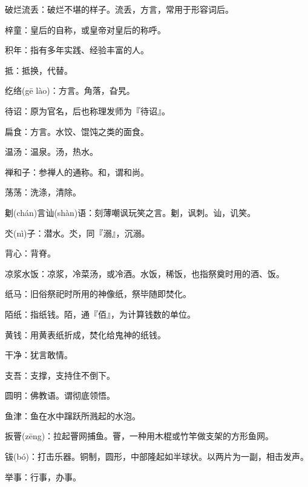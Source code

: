 \startbuffer[1484]
破烂流丢：破烂不堪的样子。流丢，方言，常用于形容词后。
\stopbuffer


\startbuffer[1485]
梓童：皇后的自称，或皇帝对皇后的称呼。
\stopbuffer


\startbuffer[1486]
积年：指有多年实践、经验丰富的人。
\stopbuffer


\startbuffer[1487]
抵：抵换，代替。
\stopbuffer


\startbuffer[1488]
纥络(gē lào)：方言。角落，旮旯。
\stopbuffer


\startbuffer[1489]
待诏：原为官名，后也称理发师为『待诏』。
\stopbuffer


\startbuffer[1490]
扁食：方言。水饺、馄饨之类的面食。
\stopbuffer


\startbuffer[1491]
温汤：温泉。汤，热水。
\stopbuffer


\startbuffer[1492]
禅和子：参禅人的通称。和，谓和尚。
\stopbuffer


\startbuffer[1493]
荡荡：洗涤，清除。
\stopbuffer


\startbuffer[1494]
劖(chán)言讪(shàn)语：刻薄嘲讽玩笑之言。劖，讽刺。讪，讥笑。
\stopbuffer


\startbuffer[1495]
氼(nì)子：潜水。氼，同『溺』，沉溺。
\stopbuffer


\startbuffer[1496]
背心：背脊。
\stopbuffer


\startbuffer[1497]
凉浆水饭：凉浆，冷菜汤，或冷酒。水饭，稀饭，也指祭奠时用的酒、饭。
\stopbuffer


\startbuffer[1498]
纸马：旧俗祭祀时所用的神像纸，祭毕随即焚化。
\stopbuffer


\startbuffer[1499]
陌纸：指纸钱。陌，通『佰』，为计算钱数的单位。
\stopbuffer


\startbuffer[1500]
黄钱：用黄表纸折成，焚化给鬼神的纸钱。
\stopbuffer


\startbuffer[1501]
干净：犹言敢情。
\stopbuffer


\startbuffer[1502]
支吾：支撑，支持住不倒下。
\stopbuffer


\startbuffer[1503]
圆明：佛教语。谓彻底领悟。
\stopbuffer


\startbuffer[1504]
鱼津：鱼在水中蹿跃所溅起的水泡。
\stopbuffer


\startbuffer[1505]
扳罾(zēng)：拉起罾网捕鱼。罾，一种用木棍或竹竿做支架的方形鱼网。
\stopbuffer


\startbuffer[1506]
钹(bó)：打击乐器。铜制，圆形，中部隆起如半球状。以两片为一副，相击发声。
\stopbuffer


\startbuffer[1507]
举事：行事，办事。
\stopbuffer



